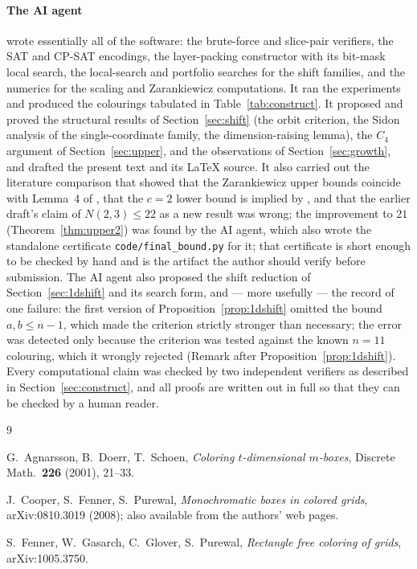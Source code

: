 \documentclass[11pt]{article}
\theoremstyle{definition}
\begin{document}
\paragraph{The AI agent} wrote essentially all of the software: the brute-force and
slice-pair verifiers, the SAT and CP-SAT encodings, the layer-packing constructor with its
bit-mask local search, the local-search and portfolio searches for the shift families, and
the numerics for the scaling and Zarankiewicz computations. It ran the experiments and
produced the colourings tabulated in Table~\ref{tab:construct}. It proposed and proved the
structural results of Section~\ref{sec:shift} (the orbit criterion, the Sidon analysis of
the single-coordinate family, the dimension-raising lemma), the $C_4$ argument of
Section~\ref{sec:upper}, and the observations of Section~\ref{sec:growth}, and drafted the
present text and its LaTeX source. It also carried out the literature comparison that
showed that the Zarankiewicz upper bounds coincide with Lemma~4 of \cite{CFP}, that the
$c=2$ lower bound is implied by \cite[Fig.~3]{CFP}, and that the earlier draft's claim of
$N(2,3)\le22$ as a new result was wrong; the improvement to $21$ (Theorem~\ref{thm:upper2})
was found by the AI agent, which also wrote the standalone certificate
\texttt{code/final\_bound.py} for it; that certificate is short enough to be checked by
hand and is the artifact the author should verify before submission. The AI agent also
proposed the shift reduction of Section~\ref{sec:1dshift} and its search form, and ---
more usefully --- the record of one failure: the first version of
Proposition~\ref{prop:1dshift} omitted the bound $a,b\le n-1$, which made the criterion
strictly stronger than necessary; the error was detected only because the criterion was
tested against the known $n=11$ colouring, which it wrongly rejected
(Remark after Proposition~\ref{prop:1dshift}). Every computational
claim was checked by two independent verifiers as described in
Section~\ref{sec:construct}, and all proofs are written out in full so that they can be
checked by a human reader.

\begin{thebibliography}{9}

 G.~Agnarsson, B.~Doerr, T.~Schoen,
\emph{Coloring $t$-dimensional $m$-boxes}, Discrete Math.\ \textbf{226} (2001), 21--33.

 J.~Cooper, S.~Fenner, S.~Purewal,
\emph{Monochromatic boxes in colored grids}, arXiv:0810.3019 (2008);
also available from the authors' web pages.

 S.~Fenner, W.~Gasarch, C.~Glover, S.~Purewal,
\emph{Rectangle free coloring of grids}, arXiv:1005.3750.

\end{thebibliography}
\end{document}
